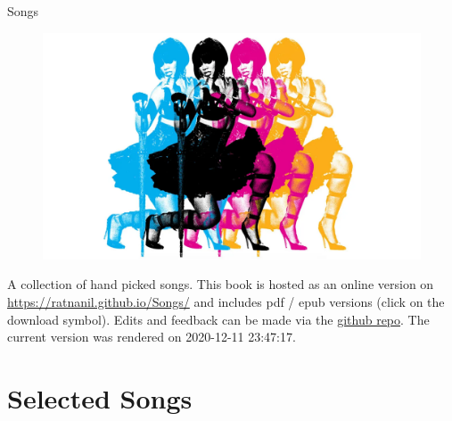 \documentclass[
]{book}
\author{}
\date{\vspace{-2.5em}}
\begin{document}

\begin{titlepage}
\begin{center}
  

\end{center}
\vspace{1.5cm}
\begin{center}

{\LARGE Songs}

\end{center}
 \vspace{1cm}

\begin{figure}[htbp]
  \centering
  \includegraphics[width=1\textwidth]{misc/title.png}
  \label{titelbild}
\end{figure}

\begin{center}
\textbf{}


\end{center} 

\vspace{1.0cm}


\end{titlepage}

{
\setcounter{tocdepth}{1}
\tableofcontents
}
A collection of hand picked songs. This book is hosted as an online version on \url{https://ratnanil.github.io/Songs/} and includes pdf / epub versions (click on the download symbol). Edits and feedback can be made via the \href{https://github.com/ratnanil/songs}{github repo}. The current version was rendered on 2020-12-11 23:47:17.

\hypertarget{selected-songs}{%
\chapter{Selected Songs}\label{selected-songs}}
\end{document}
